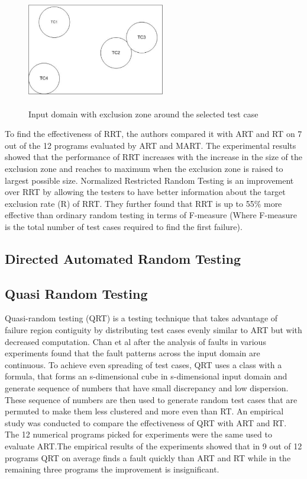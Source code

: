 \begin{figure}[h]
	\centering
	\includegraphics[width= 6cm, height = 5cm]{Literature/RRT.pdf}
	\caption{Input domain with exclusion zone around the selected test case}
\end{figure}

To find the effectiveness of RRT, the authors compared it with ART and RT on 7 out of the 12 programs evaluated by ART and MART. The experimental results showed that the performance of RRT increases with the increase in the size of the exclusion zone and reaches to maximum when the exclusion zone is raised to largest possible size. Normalized Restricted Random Testing \cite{chan2003normalized} is an improvement over RRT by allowing the testers to have better information about the target exclusion rate (R) of RRT. They further found that RRT is up to 55\% more effective than ordinary random testing in terms of F-measure (Where F-measure is the total number of test cases required to find the first failure).



\subsection{Directed Automated Random Testing}


\subsection{Quasi Random Testing}
Quasi-random testing (QRT) \cite{Chen2005} is a testing technique that takes advantage of failure region contiguity by distributing test cases evenly similar to ART but with decreased computation. Chan et al after the analysis of faults in various experiments found that the fault patterns across the input domain are continuous. To achieve even spreading of test cases, QRT uses a class with a formula, that forms an s-dimensional cube in s-dimensional input domain and generate sequence of numbers that have small discrepancy and low dispersion. These sequence of numbers are then used to generate random test cases that are permuted to make them less clustered and more even than RT. An empirical study was conducted to compare the effectiveness of QRT with ART and RT. The 12 numerical programs picked for experiments were the same used to evaluate ART.The empirical results of the experiments showed that in 9 out of 12 programs QRT on average finds a fault quickly than ART and RT while in the remaining three programs the improvement is insignificant.

